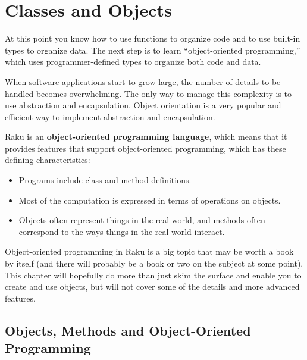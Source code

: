\chapter{Classes and Objects}
\label{objects}


At this point you know how to use functions to organize code and to use
built-in types to organize data.  The next step is to learn
``object-oriented programming,'' which uses programmer-defined types
to organize both code and data.

When software applications start to grow large, the number of 
details to be handled becomes overwhelming. The only 
way to manage this complexity is to use abstraction and 
encapsulation. Object orientation is a very popular and efficient 
way to implement abstraction and encapsulation.

Raku is an {\bf object-oriented programming language}, which means
that it provides features that support object-oriented
programming, which has these defining characteristics:

\begin{itemize}

\item Programs include class and method definitions.

\item Most of the computation is expressed in terms of operations on
  objects.

\item Objects often represent things in the real world, and methods 
often correspond to the ways things in the real world interact.

\end{itemize}


Object-oriented programming in 
Raku is a big topic that may be worth a book by itself (and 
there will probably be a book or two on the subject at some point). 
This chapter will hopefully do more than just skim the surface 
and enable you to create and use objects, but will not 
cover some of the details and more advanced features.

\section{Objects, Methods and Object-Oriented Programming}

